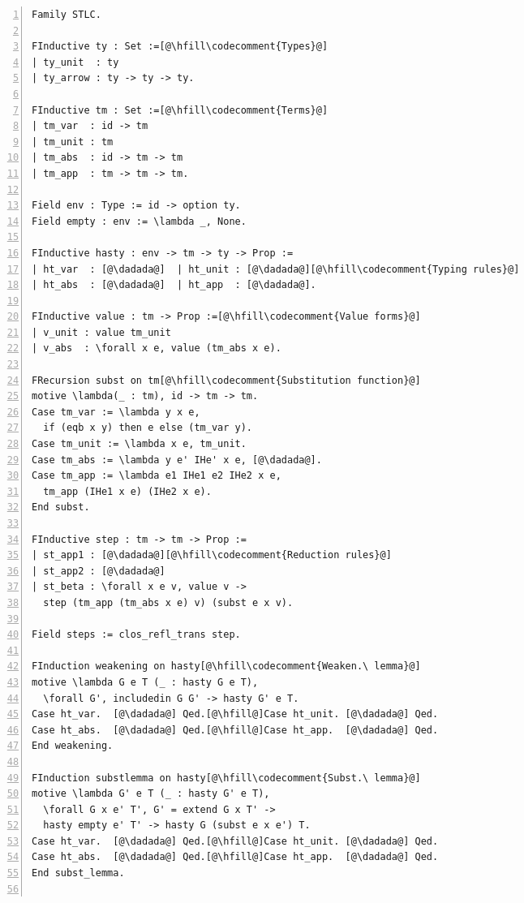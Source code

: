 \begin{figure}
\begin{minipage}{\textwidth}
\begin{multicols}{2}

\begin{lstlisting}[numbers=left]
Family STLC.

FInductive ty : Set :=[@\hfill\codecomment{Types}@]
| ty_unit  : ty
| ty_arrow : ty -> ty -> ty.

FInductive tm : Set :=[@\hfill\codecomment{Terms}@]
| tm_var  : id -> tm
| tm_unit : tm
| tm_abs  : id -> tm -> tm
| tm_app  : tm -> tm -> tm.

Field env : Type := id -> option ty.
Field empty : env := \lambda _, None.

FInductive hasty : env -> tm -> ty -> Prop :=
| ht_var  : [@\dadada@]  | ht_unit : [@\dadada@][@\hfill\codecomment{Typing rules}@]
| ht_abs  : [@\dadada@]  | ht_app  : [@\dadada@].

FInductive value : tm -> Prop :=[@\hfill\codecomment{Value forms}@]
| v_unit : value tm_unit
| v_abs  : \forall x e, value (tm_abs x e).

FRecursion subst on tm[@\hfill\codecomment{Substitution function}@] 
motive \lambda(_ : tm), id -> tm -> tm.
Case tm_var := \lambda y x e,
  if (eqb x y) then e else (tm_var y).
Case tm_unit := \lambda x e, tm_unit.
Case tm_abs := \lambda y e' IHe' x e, [@\dadada@].
Case tm_app := \lambda e1 IHe1 e2 IHe2 x e,
  tm_app (IHe1 x e) (IHe2 x e).
End subst.

FInductive step : tm -> tm -> Prop :=
| st_app1 : [@\dadada@][@\hfill\codecomment{Reduction rules}@]
| st_app2 : [@\dadada@]
| st_beta : \forall x e v, value v ->
  step (tm_app (tm_abs x e) v) (subst e x v).

Field steps := clos_refl_trans step.

FInduction weakening on hasty[@\hfill\codecomment{Weaken.\ lemma}@]
motive \lambda G e T (_ : hasty G e T),
  \forall G', includedin G G' -> hasty G' e T.
Case ht_var.  [@\dadada@] Qed.[@\hfill@]Case ht_unit. [@\dadada@] Qed.
Case ht_abs.  [@\dadada@] Qed.[@\hfill@]Case ht_app.  [@\dadada@] Qed.
End weakening.

FInduction substlemma on hasty[@\hfill\codecomment{Subst.\ lemma}@]
motive \lambda G' e T (_ : hasty G' e T),
  \forall G x e' T', G' = extend G x T' ->
  hasty empty e' T' -> hasty G (subst e x e') T.
Case ht_var.  [@\dadada@] Qed.[@\hfill@]Case ht_unit. [@\dadada@] Qed.
Case ht_abs.  [@\dadada@] Qed.[@\hfill@]Case ht_app.  [@\dadada@] Qed.
End subst_lemma.


\end{lstlisting}
\end{multicols}
\end{minipage}
\end{figure}
